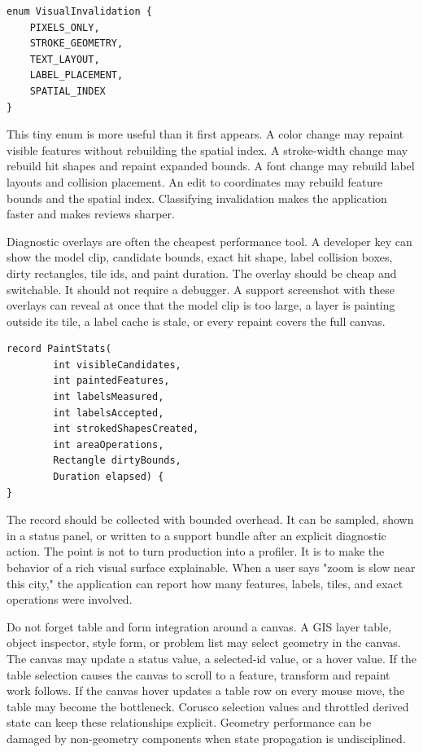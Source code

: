 \begin{lstlisting}[caption={Style changes classified for cache invalidation.}]
enum VisualInvalidation {
    PIXELS_ONLY,
    STROKE_GEOMETRY,
    TEXT_LAYOUT,
    LABEL_PLACEMENT,
    SPATIAL_INDEX
}
\end{lstlisting}

This tiny enum is more useful than it first appears. A color change may repaint visible features without rebuilding the spatial index. A stroke-width change may rebuild hit shapes and repaint expanded bounds. A font change may rebuild label layouts and collision placement. An edit to coordinates may rebuild feature bounds and the spatial index. Classifying invalidation makes the application faster and makes reviews sharper.

Diagnostic overlays are often the cheapest performance tool. A developer key can show the model clip, candidate bounds, exact hit shape, label collision boxes, dirty rectangles, tile ids, and paint duration. The overlay should be cheap and switchable. It should not require a debugger. A support screenshot with these overlays can reveal at once that the model clip is too large, a layer is painting outside its tile, a label cache is stale, or every repaint covers the full canvas.

\begin{lstlisting}[caption={A small diagnostic record for one paint pass.}]
record PaintStats(
        int visibleCandidates,
        int paintedFeatures,
        int labelsMeasured,
        int labelsAccepted,
        int strokedShapesCreated,
        int areaOperations,
        Rectangle dirtyBounds,
        Duration elapsed) {
}
\end{lstlisting}

The record should be collected with bounded overhead. It can be sampled, shown in a status panel, or written to a support bundle after an explicit diagnostic action. The point is not to turn production into a profiler. It is to make the behavior of a rich visual surface explainable. When a user says "zoom is slow near this city," the application can report how many features, labels, tiles, and exact operations were involved.

Do not forget table and form integration around a canvas. A GIS layer table, object inspector, style form, or problem list may select geometry in the canvas. The canvas may update a status value, a selected-id value, or a hover value. If the table selection causes the canvas to scroll to a feature, transform and repaint work follows. If the canvas hover updates a table row on every mouse move, the table may become the bottleneck. Corusco selection values and throttled derived state can keep these relationships explicit. Geometry performance can be damaged by non-geometry components when state propagation is undisciplined.

